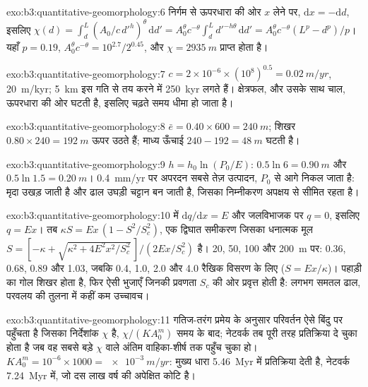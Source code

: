 \begin{solution}{exo:b3:quantitative-geomorphology:6}
निर्गम से ऊपरधारा की ओर $x$ लेने पर, $\mathrm{d}x = -\mathrm{d}d$, इसलिए $\chi(d)
= \int_d^L (A_0/c\,d'^{h})^{\theta}\,\mathrm{d}d' = A_0^{\theta} c^{-\theta}
\int_d^L d'^{-h\theta}\,\mathrm{d}d' = A_0^{\theta}c^{-\theta}(L^p -
d^p)/p$। यहाँ $p = 0.19$, $A_0^{\theta}c^{-\theta} = 10^{2.7}/2^{0.45}$,
और $\chi = \qty{2935}{m}$ प्राप्त होता है।
\end{solution}

\begin{solution}{exo:b3:quantitative-geomorphology:7}
$c = 2\times10^{-6}\times(10^8)^{0.5} = \qty{0.02}{m/yr}$, \qty{20}{m/kyr};
\qty{5}{km} इस गति से तय करने में \qty{250}{kyr} लगते हैं। क्षेत्रफल, और उसके साथ
चाल, ऊपरधारा की ओर घटती है, इसलिए  चढ़ते समय धीमा हो जाता है।
\end{solution}

\begin{solution}{exo:b3:quantitative-geomorphology:8}
$\bar e = 0.40\times600 = \qty{240}{m}$; शिखर $0.80\times240 =
\qty{192}{m}$ ऊपर उठते हैं; माध्य ऊँचाई $240 - 192 = \qty{48}{m}$ घटती है।
\end{solution}

\begin{solution}{exo:b3:quantitative-geomorphology:9}
$h = h_0\ln(P_0/E)$: $0.5\ln 6 = \qty{0.90}{m}$ और $0.5\ln1.5 =
\qty{0.20}{m}$। \qty{0.4}{mm/yr} पर अपरदन सबसे तेज़ उत्पादन,
$P_0$ से आगे निकल जाता है: मृदा उखड़ जाती है और ढाल उघड़ी चट्टान बन जाती है, जिसका निम्नीकरण
अपक्षय से सीमित रहता है।
\end{solution}

\begin{solution}{exo:b3:quantitative-geomorphology:10}
 में $\mathrm{d}q/\mathrm{d}x = E$ और जलविभाजक पर $q = 0$, इसलिए
$q = E x$। तब $\kappa S = E x\,(1 - S^2/S_c^2)$, एक द्विघात समीकरण जिसका धनात्मक
मूल $S = [-\kappa + \sqrt{\kappa^2 + 4E^2x^2/S_c^2}\,]/(2Ex/S_c^2)$ है।
20, 50, 100 और \qty{200}{m} पर: 0.36, 0.68, 0.89 और 1.03, जबकि 0.4, 1.0,
2.0 और 4.0 रैखिक विसरण के लिए ($S = Ex/\kappa$)। पहाड़ी का गोल
शिखर होता है, फिर ऐसी भुजाएँ जिनकी प्रवणता $S_c$ की ओर प्रवृत्त होती है: लगभग समतल ढाल,
परवलय की तुलना में कहीं कम उच्चावच।
\end{solution}

\begin{solution}{exo:b3:quantitative-geomorphology:11}
गतिज-तरंग प्रमेय के अनुसार परिवर्तन ऐसे बिंदु पर पहुँचता है जिसका निर्देशांक
$\chi$ है, $\chi/(KA_0^m)$ समय के बाद; नेटवर्क तब पूरी तरह प्रतिक्रिया दे चुका होता है जब
वह सबसे बड़े $\chi$ वाले अंतिम वाहिका-शीर्ष तक पहुँच चुका हो। $K A_0^m = 10^{-6}\times
1000 = \qty{e-3}{m/yr}$: मुख्य धारा \qty{5.46}{Myr} में प्रतिक्रिया देती है, नेटवर्क
\qty{7.24}{Myr} में, जो दस लाख वर्ष की अपेक्षित कोटि है।
\end{solution}

